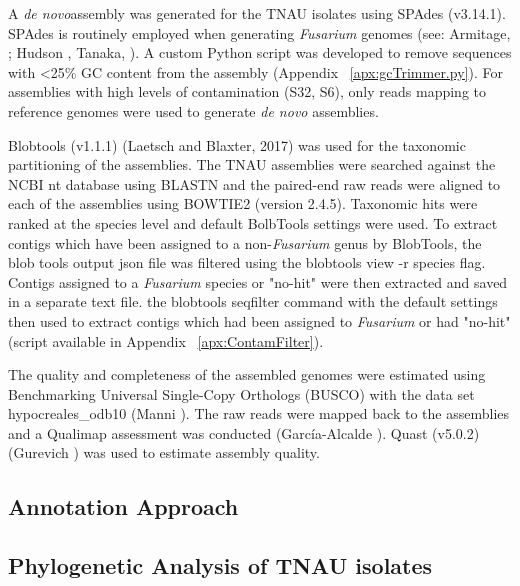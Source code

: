 A \textit{de novo}assembly was generated for the TNAU isolates using SPAdes (v3.14.1). SPAdes is routinely employed when generating \textit{Fusarium} genomes (see: Armitage, ; Hudson , Tanaka, ). A custom Python script was developed to remove sequences with <25\% GC content from the assembly (Appendix ~\ref{apx:gcTrimmer.py}). For assemblies with high levels of contamination (S32, S6), only reads mapping to reference genomes were used to generate \textit{de novo} assemblies.

Blobtools (v1.1.1) (Laetsch and Blaxter, 2017) was used for the taxonomic partitioning of the assemblies. The TNAU assemblies were searched against the NCBI nt database using BLASTN and the paired-end raw reads were aligned to each of the assemblies using BOWTIE2 (version 2.4.5). Taxonomic hits were ranked at the species level and default BolbTools settings were used. To extract contigs which have been assigned to a non-\textit{Fusarium} genus by BlobTools, the blob tools output json file was filtered using the blobtools view -r species flag. Contigs assigned to a \textit{Fusarium} species or "no-hit" were then extracted and saved in a separate text file. the blobtools seqfilter command with the default settings then used to extract contigs which had been assigned to \textit{Fusarium} or had "no-hit" (script available in Appendix ~\ref{apx:ContamFilter}).

The quality and completeness of the assembled genomes were estimated using Benchmarking Universal Single-Copy Orthologs (BUSCO) with the data set hypocreales\_odb10 (Manni ). The raw reads were mapped back to the assemblies and a Qualimap assessment was conducted (García-Alcalde ). Quast (v5.0.2) (Gurevich ) was used to estimate assembly quality. 


\subsection{Annotation Approach}

\subsection{Phylogenetic Analysis of TNAU isolates}\label{chap2:phylogeny}

